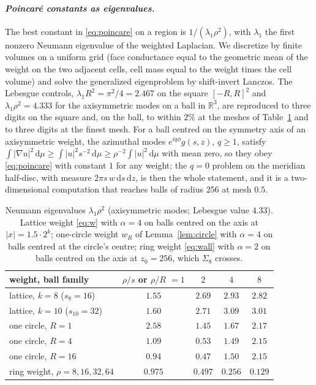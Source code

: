\documentclass[11pt]{amsart}
\newcommand{\R}{\mathbb{R}}
\newcommand{\dd}{\,\mathrm{d}}
\newcommand{\abs}[1]{\lvert #1\rvert}
\theoremstyle{plain}
\theoremstyle{definition}
\theoremstyle{remark}
\begin{document}
\paragraph{\textit{Poincar\'e constants as eigenvalues.}}
The best constant in \eqref{eq:poincare} on a region is $1/(\lambda_1\rho^2)$,
with $\lambda_1$ the first nonzero Neumann eigenvalue of the weighted Laplacian.
We discretize by finite volumes on a uniform grid (face conductance equal to
the geometric mean of the weight on the two adjacent cells, cell mass equal to
the weight times the cell volume) and solve the generalized eigenproblem by
shift-invert Lanczos. The Lebesgue controls, $\lambda_1R^2=\pi^2/4=2.467$ on the
square $[-R,R]^2$ and $\lambda_1\rho^2=4.333$ for the axisymmetric modes on a
ball in $\R^3$, are reproduced to three digits on the square and, on the ball,
to within $2\%$ at the meshes of Table~\ref{tab:eigen} and to three digits at the
finest mesh. For a ball centred on the
symmetry axis of an axisymmetric weight, the azimuthal modes $e^{iq\phi}g(s,z)$,
$q\ge1$, satisfy $\int\abs{\nabla u}^2\dd\mu\ge\int\abs{u}^2s^{-2}\dd\mu\ge
\rho^{-2}\int\abs u^2\dd\mu$ with mean zero, so they obey \eqref{eq:poincare}
with constant $1$ for any weight; the $q=0$ problem on the meridian half-disc,
with measure $2\pi s\,w\dd s\dd z$, is then the whole statement, and it is a
two-dimensional computation that reaches balls of radius $256$ at mesh $0.5$.

\begin{table}[t]
\caption{Neumann eigenvalues $\lambda_1\rho^2$ (axisymmetric modes; Lebesgue
value $4.33$). Lattice weight \eqref{eq:w} with $\alpha=4$ on balls centred on
the axis at $\abs x=1.5\cdot2^k$; one-circle weight $w_R$ of
Lemma~\ref{lem:circle} with $\alpha=4$ on balls centred at the circle's centre; ring weight
\eqref{eq:wall} with $\alpha=2$ on balls centred on the axis at $z_0=256$,
which $\Sigma_8$ crosses.}
\label{tab:eigen}
\small
\begin{tabular}{@{}lcccc@{}}
\toprule
weight, ball family & $\rho/s$ or $\rho/R$ $=1$ & $2$ & $4$ & $8$ \\
\midrule
lattice, $k=8$ ($s_8=16$) & $1.55$ & $2.69$ & $2.93$ & $2.82$ \\
lattice, $k=10$ ($s_{10}=32$) & $1.60$ & $2.71$ & $3.09$ & $3.01$ \\
one circle, $R=1$ & $2.58$ & $1.45$ & $1.67$ & $2.17$ \\
one circle, $R=4$ & $1.09$ & $0.53$ & $1.49$ & $2.15$ \\
one circle, $R=16$ & $0.94$ & $0.47$ & $1.50$ & $2.15$ \\
ring weight, $\rho=8,16,32,64$ & $0.975$ & $0.497$ & $0.256$ & $0.129$ \\
\bottomrule
\end{tabular}
\end{table}
\end{document}

